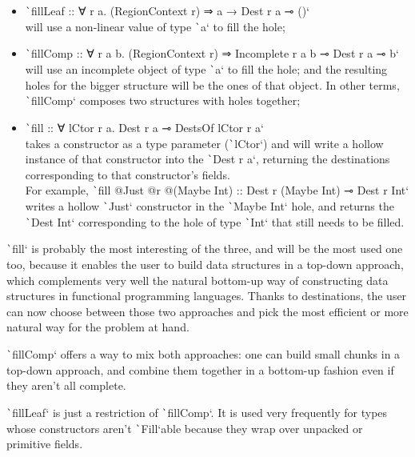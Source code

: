 \documentclass[english]{jflart}
\begin{document}
\begin{itemize}
  \item \texttt`fillLeaf :: ∀ r a. (RegionContext r) ⇒ a → Dest r a ⊸ ()` \\will use a non-linear value of type \texttt`a` to fill the hole;
  \item \texttt`fillComp :: ∀ r a b. (RegionContext r) ⇒ Incomplete r a b ⊸ Dest r a ⊸ b` \\will use an incomplete object of type \texttt`a` to fill the hole; and the resulting holes for the bigger structure will be the ones of that object. In other terms, \texttt`fillComp` composes two structures with holes together;
  \item \texttt`fill :: ∀ lCtor r a. Dest r a ⊸ DestsOf lCtor r a` \\takes a constructor as a type parameter (\texttt`lCtor`) and will write a hollow instance of that constructor into the \texttt`Dest r a`, returning the destinations corresponding to that constructor's fields.\\ For example, \texttt`fill @Just @r @(Maybe Int) :: Dest r (Maybe Int) ⊸ Dest r Int` writes a hollow \texttt`Just` constructor in the \texttt`Maybe Int` hole, and returns the \texttt`Dest Int` corresponding to the hole of type \texttt`Int` that still needs to be filled.
\end{itemize}

\texttt`fill` is probably the most interesting of the three, and will be the most used one too, because it enables the user to build data structures in a top-down approach, which complements very well the natural bottom-up way of constructing data structures in functional programming languages. Thanks to destinations, the user can now choose between those two approaches and pick the most efficient or more natural way for the problem at hand.

\texttt`fillComp` offers a way to mix both approaches: one can build small chunks in a top-down approach, and combine them together in a bottom-up fashion even if they aren't all complete.

\texttt`fillLeaf` is just a restriction of \texttt`fillComp`. It is used very frequently for types whose constructors aren't \texttt`Fill`able because they wrap over unpacked or primitive fields.
\end{document}
